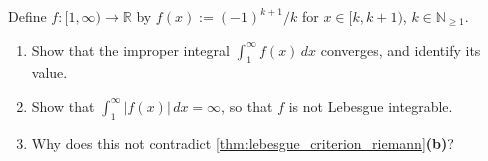 \begin{aiexercise}
\label{ex:ai_improper_not_lebesgue}
Define $f : [1,\infty) \to \mathbb{R}$ by $f(x) := (-1)^{k+1}/k$ for $x \in [k,k+1)$,
$k \in \mathbb{N}_{\ge1}$.
\begin{enumerate}[label=\textbf{(\alph*)}]
  \item Show that the improper integral $\int_1^\infty f(x)\,dx$ converges, and identify its value.
  \item Show that $\int_1^\infty \lvert f(x)\rvert\,dx = \infty$, so that $f$ is not Lebesgue
    integrable.
  \item Why does this not contradict \cref{thm:lebesgue_criterion_riemann}\textbf{(b)}?
\end{enumerate}
\end{aiexercise}
